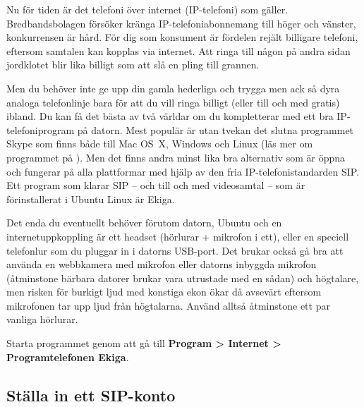 \documentclass[a4paper,final]{memoir} %
\begin{document}

Nu för tiden är det telefoni över internet (IP-telefoni) som gäller. Bredbandsbolagen försöker kränga IP-telefoniabonnemang till höger och vänster, konkurrensen är hård. För dig som konsument är fördelen rejält billigare telefoni, eftersom samtalen kan kopplas via internet. Att ringa till någon på andra sidan jordklotet blir lika billigt som att slå en pling till grannen. 

Men du behöver inte ge upp din gamla hederliga och trygga men ack så dyra analoga telefonlinje bara för att du vill ringa billigt (eller till och med gratis) ibland. Du kan få det bästa av två världar om du kompletterar med ett bra IP-telefoniprogram på datorn. Mest populär är utan tvekan det slutna programmet Skype som finns både till Mac OS~X, Windows och Linux (läs mer om programmet på ). Men det finns andra minst lika bra alternativ som är öppna och fungerar på alla plattformar med hjälp av den fria IP-telefonistandarden SIP. Ett program som klarar SIP -- och till och med videosamtal -- som är förinstallerat i Ubuntu Linux är Ekiga. 


Det enda du eventuellt behöver förutom datorn, Ubuntu och en internetuppkoppling är ett headset (hörlurar + mikrofon i ett), eller en speciell telefonlur som du pluggar in i datorns USB-port. Det brukar också gå bra att använda en webbkamera med mikrofon eller datorns inbyggda mikrofon (åtminstone bärbara datorer brukar vara utrustade med en sådan) och högtalare, men risken för burkigt ljud med konstiga ekon ökar då avsevärt eftersom mikrofonen tar upp ljud från högtalarna. Använd alltså åtminstone ett par vanliga hörlurar.

Starta programmet genom att gå till \textbf{Program \textgreater{} Internet \textgreater{} Programtelefonen Ekiga}. 

\subsection{Ställa in ett SIP-konto}
\end{document}
